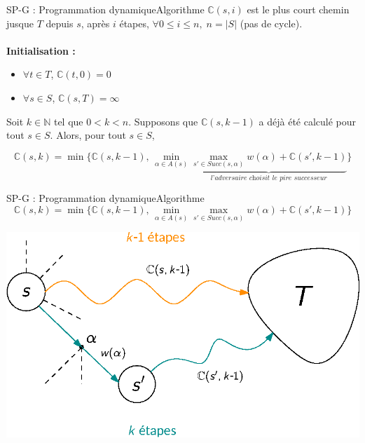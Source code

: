 \documentclass[compress]{beamer}
\theoremstyle{theorem}%
\begin{document}
\begin{frame}{SP-G : Programmation dynamique}{Algorithme}
    $\mathbb{C}(s, i)$ est le plus court chemin jusque $T$ depuis $s$, après $i$ étapes, $\forall 0 \leq i \leq n, \; n = |S|$ (pas de cycle).%
    \\ $ $ \vspace{-0.03\linewidth}\\
      \textbf{\color{fibeamer@orange}Initialisation : }
      \begin{itemize}
        \item $\forall t \in T$, $\mathbb{C}(t, 0) = 0$
        \item $\forall s \in S$, $\mathbb{C}(s, T) = \infty$
      \end{itemize}
      Soit $k \in \mathbb{N}$ tel que $0 < k < n$. Supposons que $\mathbb{C}(s, k-1)$ a déjà été calculé pour tout $s \in S$.
        Alors, pour tout $s \in S$,

  \[
    \mathbb{C}(s, k) =
    \min \{
      \mathbb{C}(s, k-1), \,
        \min_{\alpha \in A(s)} \underbrace{\max_{s'\in Succ(s, \alpha)} w(\alpha) + \mathbb{C}(s', k-1)}_{\textit{l'adversaire choisit le pire successeur}}
    \}
  \]
\end{frame}

\begin{frame}{SP-G : Programmation dynamique}{Algorithme}
  \[
    \mathbb{C}(s, k) =
    \min \{
      \mathbb{C}(s, k-1), \,
        \min_{\alpha \in A(s)} \max_{s'\in Succ(s, \alpha)} w(\alpha) + \mathbb{C}(s', k-1)
    \}
  \]
  \begin{center}
    \includegraphics[width=0.6\linewidth]{resources/sp-g}
  \end{center}
\end{frame}
\end{document}
